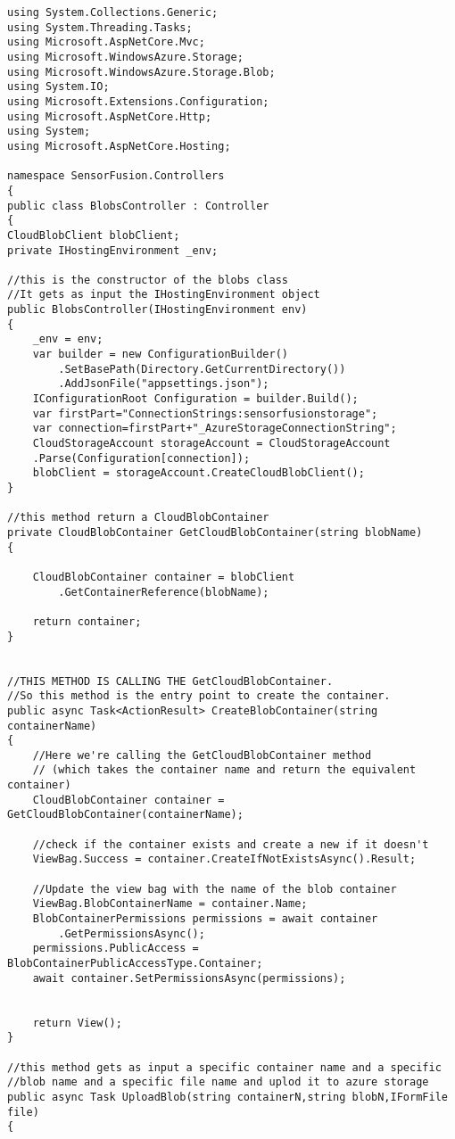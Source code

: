\begin{lstlisting}
using System.Collections.Generic;
using System.Threading.Tasks;
using Microsoft.AspNetCore.Mvc;
using Microsoft.WindowsAzure.Storage;
using Microsoft.WindowsAzure.Storage.Blob;
using System.IO;
using Microsoft.Extensions.Configuration;
using Microsoft.AspNetCore.Http;
using System;
using Microsoft.AspNetCore.Hosting;

namespace SensorFusion.Controllers
{
public class BlobsController : Controller
{
CloudBlobClient blobClient;
private IHostingEnvironment _env;

//this is the constructor of the blobs class
//It gets as input the IHostingEnvironment object
public BlobsController(IHostingEnvironment env)
{
	_env = env;
	var builder = new ConfigurationBuilder()
		.SetBasePath(Directory.GetCurrentDirectory())
		.AddJsonFile("appsettings.json");
	IConfigurationRoot Configuration = builder.Build();
	var firstPart="ConnectionStrings:sensorfusionstorage";
	var connection=firstPart+"_AzureStorageConnectionString";
	CloudStorageAccount storageAccount = CloudStorageAccount
	.Parse(Configuration[connection]);
	blobClient = storageAccount.CreateCloudBlobClient();
}

//this method return a CloudBlobContainer
private CloudBlobContainer GetCloudBlobContainer(string blobName)
{

	CloudBlobContainer container = blobClient
		.GetContainerReference(blobName);

	return container;
}


//THIS METHOD IS CALLING THE GetCloudBlobContainer. 
//So this method is the entry point to create the container.
public async Task<ActionResult> CreateBlobContainer(string containerName)
{
	//Here we're calling the GetCloudBlobContainer method
	// (which takes the container name and return the equivalent container)
	CloudBlobContainer container = GetCloudBlobContainer(containerName);

	//check if the container exists and create a new if it doesn't
	ViewBag.Success = container.CreateIfNotExistsAsync().Result;

	//Update the view bag with the name of the blob container
	ViewBag.BlobContainerName = container.Name;
	BlobContainerPermissions permissions = await container
		.GetPermissionsAsync();
	permissions.PublicAccess = BlobContainerPublicAccessType.Container;
	await container.SetPermissionsAsync(permissions);


	return View();
}

//this method gets as input a specific container name and a specific 
//blob name and a specific file name and uplod it to azure storage
public async Task UploadBlob(string containerN,string blobN,IFormFile file)
{


\end{lstlisting}
